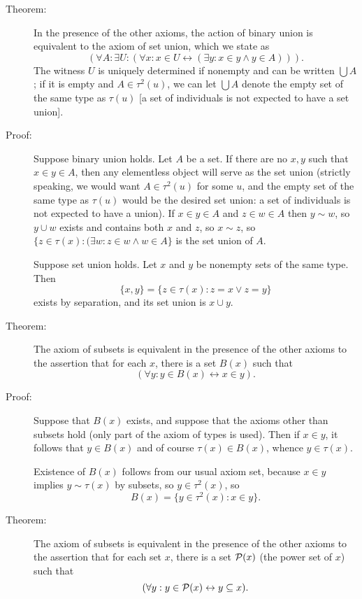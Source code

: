 \documentclass[12pt]{article}
\begin{document}
\begin{description}

\item[Theorem:]  In the presence of the other axioms, the action of binary union is equivalent to the axiom of set union, which we state as $$(\forall A:\exists U:(\forall x:x \in U \leftrightarrow (\exists y:x \in y \wedge y \in A))).$$  The witness $U$ is uniquely determined if nonempty and can be written $\bigcup A$;  if it is empty and $A \in \tau^2(u)$, we can let $\bigcup A$ denote the empty set of the same type as $\tau(u)$ [a set of individuals is not expected to have a set union].

\item[Proof:]  Suppose binary union holds.  Let $A$ be a set.  If there are no $x,y$ such that $x \in y \in A$, then any elementless object will serve as the set union (strictly speaking, we would want $A \in \tau^2(u)$ for some $u$, and the empty set of the same type as $\tau(u)$ would be the desired set union:  a set of individuals is not expected to have a union).  If $x \in y \in A$ and $z \in w \in A$ then $y \sim w$, so $y \cup w$ exists and contains both $x$ and $z$, so $x \sim z$, so $\{z \in \tau(x):(\exists w:z \in w \wedge w \in A\}$ is the set union of $A$.

Suppose set union holds.  Let $x$ and $y$ be nonempty sets of the same type.  Then $$\{x,y\} = \{z \in \tau(x):z=x \vee z=y\}$$ exists by separation, and its set union is $x \cup y$.

\item[Theorem:]  The axiom of subsets is equivalent in the presence of the other axioms to the assertion that for each $x$, there is a set $B(x)$ such that $$(\forall y:y \in B(x)\leftrightarrow x \in y).$$

\item[Proof:]   Suppose that $B(x)$ exists, and suppose that the axioms other than subsets hold (only part of the axiom of types is used).  Then if $x \in y$, it follows that $y \in B(x)$ and of course
$\tau(x) \in B(x)$, whence $y \in \tau(x)$.

Existence of $B(x)$ follows from our usual axiom set, because $x \in y$ implies $y \sim \tau(x)$ by subsets,
so $y \in \tau^2(x)$, so $$B(x) = \{y \in \tau^2(x):x \in y\}.$$

\item[Theorem:]  The axiom of subsets is equivalent in the presence of the other axioms to the assertion that for each set $x$, there is a set ${\cal P}(x)$ (the power set of $x$) such that $$(\forall y:y \in {\cal P}(x)\leftrightarrow y \subseteq x).$$


\end{description}
\end{document}
